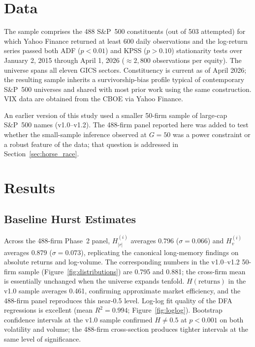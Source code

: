 \documentclass[preprint,12pt,authoryear]{elsarticle}
\begin{document}
\section{Data}
\label{sec:data}

The sample comprises the 488 S\&P~500 constituents (out of 503 attempted) for which Yahoo Finance returned at least 600 daily observations and the log-return series passed both ADF ($p < 0.01$) and KPSS ($p > 0.10$) stationarity tests over January 2, 2015 through April 1, 2026 ($\approx 2{,}800$ observations per equity). The universe spans all eleven GICS sectors. Constituency is current as of April 2026; the resulting sample inherits a survivorship-bias profile typical of contemporary S\&P~500 universes and shared with most prior work using the same construction. VIX data are obtained from the CBOE via Yahoo Finance.

An earlier version of this study used a smaller 50-firm sample of large-cap S\&P~500 names (v1.0--v1.2). The 488-firm panel reported here was added to test whether the small-sample inference observed at $G = 50$ was a power constraint or a robust feature of the data; that question is addressed in Section~\ref{sec:horse_race}.

\section{Results}
\label{sec:results}

\subsection{Baseline Hurst Estimates}

Across the 488-firm Phase~2 panel, $H^{(i)}_{|r|}$ averages 0.796 ($\sigma = 0.066$) and $H^{(i)}_{v}$ averages 0.879 ($\sigma = 0.073$), replicating the canonical long-memory findings on absolute returns and log-volume. The corresponding numbers in the v1.0--v1.2 50-firm sample (Figure~\ref{fig:distributions}) are 0.795 and 0.881; the cross-firm mean is essentially unchanged when the universe expands tenfold. $H(\text{returns})$ in the v1.0 sample averages 0.461, confirming approximate market efficiency, and the 488-firm panel reproduces this near-0.5 level. Log-log fit quality of the DFA regressions is excellent (mean $R^2 = 0.994$; Figure~\ref{fig:loglog}). Bootstrap confidence intervals at the v1.0 sample confirmed $H \neq 0.5$ at $p < 0.001$ on both volatility and volume; the 488-firm cross-section produces tighter intervals at the same level of significance.
\end{document}
